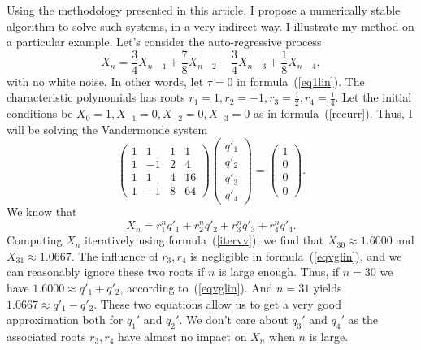 \documentclass[oneside,10pt]{book}
\begin{document}
Using the methodology presented in this article, I propose a numerically stable algorithm to solve such systems, in a very indirect way. I illustrate my method on a particular example. Let's consider the auto-regressive process
\begin{equation}\label{itervv}
X_n=\frac{3}{4}X_{n-1} + \frac{7}{8} X_{n-2} -\frac{3}{4} X_{n-3} +\frac{1}{8} X_{n-4},
\end{equation}
with no white noise. In other words, let $\tau=0$ in formula~(\ref{eq1lin}). The characteristic polynomials has roots $r_1=1,r_2=-1,r_3=\frac{1}{2},r_4=\frac{1}{4}$. Let the initial conditions be $X_0=1,X_{-1}=0, X_{-2}=0, X_{-3}=0$ as in formula~(\ref{recurr}). Thus, I will be solving the Vandermonde system
\begin{equation}\label{refrecu}
\left(
\begin{array}{rrrr}
      1 & 1 & 1 & 1 \\
     1 & -1 & 2 & 4 \\
     1 & 1 & 4  & 16 \\
    1 &  -1 & 8  &  64
\end{array}
\right)
\left(
\begin{aligned}
      q'_1\\
     q'_2 \\
     q'_3 \\
    q'_4
\end{aligned}
\right) =
\left(
\begin{array}{c}
      1 \\
     0\\
     0 \\
    0
\end{array}
\right).
\end{equation}
We know that
\begin{equation}\label{eqvglin}
X_n=r_1^nq'_1 + r_2^n q'_2 + r_3^n q'_3+r_4^n q'_4.
\end{equation}
Computing $X_n$ iteratively using formula~(\ref{itervv}), we find that
$X_{30}\approx 1.6000$ and $X_{31}\approx 1.0667$. The influence of $r_3, r_4$ is negligible in formula~(\ref{eqvglin}), and we can reasonably ignore these two roots if $n$ is large enough. Thus, if $n=30$ we have $1.6000 \approx q'_1 + q'_2$, according to~(\ref{eqvglin}). And $n=31$ yields $1.0667 \approx q'_1 - q'_2$. These two equations allow us to get a very good approximation both for $q_1'$ and $q_2'$. We don't care about $q_3'$ and $q_4'$ as the associated roots $r_3,r_4$ have almost no impact on $X_n$ when $n$ is large.
\end{document}
